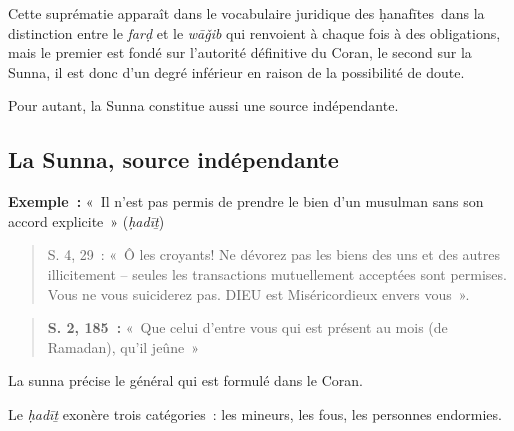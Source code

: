 Cette suprématie apparaît dans le vocabulaire juridique des
ḥanafītes~dans la distinction entre le \emph{farḍ} et le \emph{wāǧib}
qui renvoient à chaque fois à des obligations, mais le premier est fondé
sur l'autorité définitive du Coran, le second sur la Sunna, il est donc
d'un degré inférieur en raison de la possibilité de doute.

Pour autant, la Sunna constitue aussi une source indépendante.


\subsection{La Sunna, source
indépendante}\label{la-sunna-source-induxe9pendante}


\textbf{Exemple~:} «~Il n'est pas permis de prendre le bien d'un
musulman sans son accord explicite~» (\emph{ḥadīṯ})
\begin{quote}
   S. 4, 29~: «~Ô les croyants! Ne dévorez pas les biens des uns et des
autres illicitement -- seules les transactions mutuellement acceptées
sont permises. Vous ne vous suiciderez pas. DIEU est Miséricordieux
envers vous~».
 
\end{quote}

\begin{quote}
  \textbf{S. 2, 185~:} «~Que celui d'entre vous qui est présent au mois
(de Ramadan), qu'il jeûne~»

  
\end{quote}

La sunna précise le général qui est formulé dans le Coran.

Le \emph{ḥadīṯ} exonère trois catégories~: les mineurs, les fous, les
personnes endormies.

